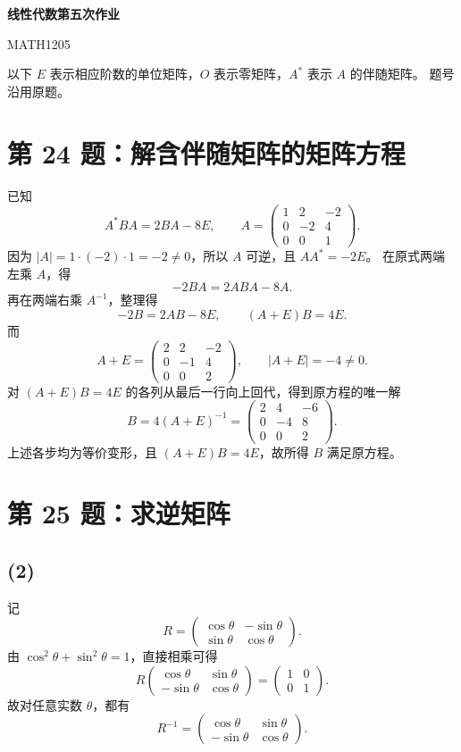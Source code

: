 \documentclass[11pt,a4paper,fontset=fandol]{ctexart}
\newcommand{\ans}[1]{\boxed{#1}}
\newcommand{\problem}[1]{\Needspace{9\baselineskip}\section*{#1}}
\begin{document}
\begin{center}
{\LARGE\bfseries 线性代数第五次作业}\par
\vspace{0.3em}
{\small MATH1205}
\end{center}
\vspace{-0.5em}
以下 $E$ 表示相应阶数的单位矩阵，$O$ 表示零矩阵，$A^*$ 表示 $A$ 的伴随矩阵。
题号沿用原题。

\problem{第 24 题：解含伴随矩阵的矩阵方程}
已知
\[
A^*BA=2BA-8E,\qquad
A=\begin{pmatrix}1&2&-2\\0&-2&4\\0&0&1\end{pmatrix}.
\]
因为 $|A|=1\cdot(-2)\cdot1=-2\ne0$，所以 $A$ 可逆，且 $AA^*=-2E$。
在原式两端左乘 $A$，得
\[
-2BA=2ABA-8A.
\]
再在两端右乘 $A^{-1}$，整理得
\[
-2B=2AB-8E,\qquad (A+E)B=4E.
\]
而
\[
A+E=\begin{pmatrix}2&2&-2\\0&-1&4\\0&0&2\end{pmatrix},
\qquad |A+E|=-4\ne0.
\]
对 $(A+E)B=4E$ 的各列从最后一行向上回代，得到原方程的唯一解
\[
\ans{B=4(A+E)^{-1}=
\begin{pmatrix}2&4&-6\\0&-4&8\\0&0&2\end{pmatrix}}.
\]
上述各步均为等价变形，且 $(A+E)B=4E$，故所得 $B$ 满足原方程。

\problem{第 25 题：求逆矩阵}
\subsection*{(2)}
记
\[
R=\begin{pmatrix}\cos\theta&-\sin\theta\\\sin\theta&\cos\theta\end{pmatrix}.
\]
由 $\cos^2\theta+\sin^2\theta=1$，直接相乘可得
\[
R\begin{pmatrix}\cos\theta&\sin\theta\\-\sin\theta&\cos\theta\end{pmatrix}
=\begin{pmatrix}1&0\\0&1\end{pmatrix}.
\]
故对任意实数 $\theta$，都有
\[
\ans{R^{-1}=\begin{pmatrix}\cos\theta&\sin\theta\\-\sin\theta&\cos\theta\end{pmatrix}}.
\]
\end{document}
